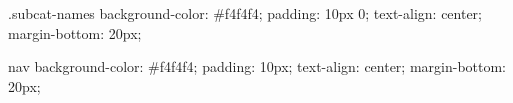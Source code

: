 .subcat-names {
            background-color: #f4f4f4;
            padding: 10px 0;
            text-align: center;
            margin-bottom: 20px;
        }


        nav {
            background-color: #f4f4f4;
            padding: 10px;
            text-align: center;
            margin-bottom: 20px;
        }